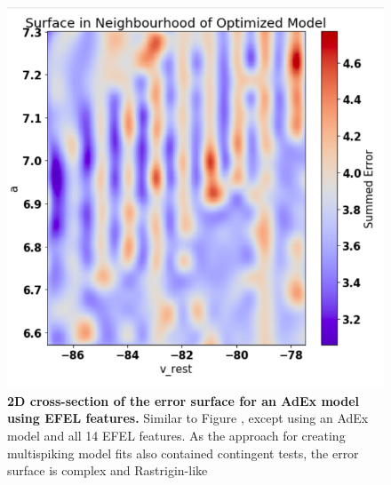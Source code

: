 \begin{figure}
    \centering
    \includegraphics[scale=0.75]{figures/corrogations.png}
        \caption[A Complicated Error Surface]{\textbf{2D cross-section of the error surface for an AdEx model using EFEL features.}
    Similar to Figure \label{fig:constant_current}, except using an AdEx model and all 14 EFEL features.
    As the approach for creating multispiking model fits also contained contingent tests, the error surface is complex and Rastrigin-like}
    \label{fig:real_problem_nontrivial_surface-1}
\end{figure}



